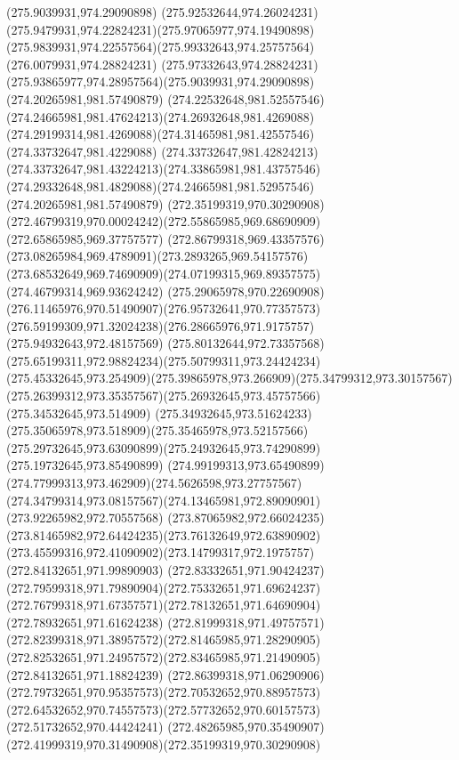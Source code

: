 {{		\moveto(275.9039931,974.29090898)
		\curveto(275.92532644,974.26024231)(275.9479931,974.22824231)(275.97065977,974.19490898)
		\curveto(275.9839931,974.22557564)(275.99332643,974.25757564)(276.0079931,974.28824231)
		\curveto(275.97332643,974.28824231)(275.93865977,974.28957564)(275.9039931,974.29090898)
		\moveto(274.20265981,981.57490879)
		\curveto(274.22532648,981.52557546)(274.24665981,981.47624213)(274.26932648,981.4269088)
		\curveto(274.29199314,981.4269088)(274.31465981,981.42557546)(274.33732647,981.4229088)
		\curveto(274.33732647,981.42824213)(274.33732647,981.43224213)(274.33865981,981.43757546)
		\curveto(274.29332648,981.4829088)(274.24665981,981.52957546)(274.20265981,981.57490879)
		\moveto(272.35199319,970.30290908)
		\curveto(272.46799319,970.00024242)(272.55865985,969.68690909)(272.65865985,969.37757577)
		\curveto(272.86799318,969.43357576)(273.08265984,969.4789091)(273.2893265,969.54157576)
		\curveto(273.68532649,969.74690909)(274.07199315,969.89357575)(274.46799314,969.93624242)
		\curveto(275.29065978,970.22690908)(276.11465976,970.51490907)(276.95732641,970.77357573)
		\curveto(276.59199309,971.32024238)(276.28665976,971.9175757)(275.94932643,972.48157569)
		\curveto(275.80132644,972.73357568)(275.65199311,972.98824234)(275.50799311,973.24424234)
		\curveto(275.45332645,973.254909)(275.39865978,973.266909)(275.34799312,973.30157567)
		\curveto(275.26399312,973.35357567)(275.26932645,973.45757566)(275.34532645,973.514909)
		\curveto(275.34932645,973.51624233)(275.35065978,973.518909)(275.35465978,973.52157566)
		\curveto(275.29732645,973.63090899)(275.24932645,973.74290899)(275.19732645,973.85490899)
		\curveto(274.99199313,973.65490899)(274.77999313,973.462909)(274.5626598,973.27757567)
		\curveto(274.34799314,973.08157567)(274.13465981,972.89090901)(273.92265982,972.70557568)
		\curveto(273.87065982,972.66024235)(273.81465982,972.64424235)(273.76132649,972.63890902)
		\curveto(273.45599316,972.41090902)(273.14799317,972.1975757)(272.84132651,971.99890903)
		\curveto(272.83332651,971.90424237)(272.79599318,971.79890904)(272.75332651,971.69624237)
		\curveto(272.76799318,971.67357571)(272.78132651,971.64690904)(272.78932651,971.61624238)
		\curveto(272.81999318,971.49757571)(272.82399318,971.38957572)(272.81465985,971.28290905)
		\curveto(272.82532651,971.24957572)(272.83465985,971.21490905)(272.84132651,971.18824239)
		\curveto(272.86399318,971.06290906)(272.79732651,970.95357573)(272.70532652,970.88957573)
		\curveto(272.64532652,970.74557573)(272.57732652,970.60157573)(272.51732652,970.44424241)
		\curveto(272.48265985,970.35490907)(272.41999319,970.31490908)(272.35199319,970.30290908)
}}
